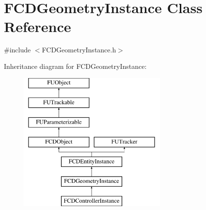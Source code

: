 \hypertarget{classFCDGeometryInstance}{
\section{FCDGeometryInstance Class Reference}
\label{classFCDGeometryInstance}
}


{\ttfamily \#include $<$FCDGeometryInstance.h$>$}

Inheritance diagram for FCDGeometryInstance:\begin{figure}[H]
\begin{center}
\leavevmode
\includegraphics[height=7.000000cm]{classFCDGeometryInstance}
\end{center}
\end{figure}
